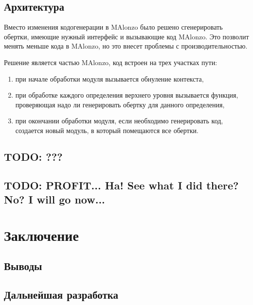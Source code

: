 \subsection{Архитектура}

Вместо изменения кодогенерации в MAlonzo было решено сгенерировать
обертки, имеющие нужный интерфейс и вызывающие код MAlonzo. Это
позволит менять меньше кода в MAlonzo, но это внесет проблемы с производительностью.

Решение является частью MAlonzo, код встроен на трех участках пути:
\begin{enumerate}
\item при начале обработки модуля вызывается обнуление контекста,
\item при обработке каждого определения верхнего уровня вызывается
      функция, проверяющая надо ли генерировать обертку для данного определения,
\item при окончании обработки модуля, если необходимо генерировать код, создается
      новый модуль, в который помещаются все обертки.
\end{enumerate}

\subsection{TODO: ???}

\subsection{TODO: PROFIT... Ha! See what I did there? No? I will go now...}

\newpage
\section{Заключение}

\subsection{Выводы}

\subsection{Дальнейшая разработка}
